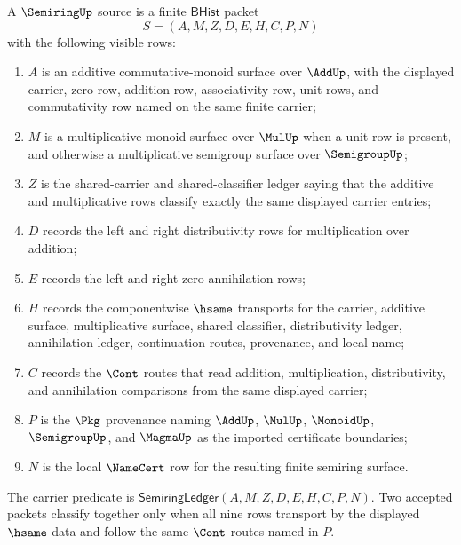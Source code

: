 \begin{definition}
\label{def:semiring-bhist-source}
A $\SemiringUp$ source is a finite $\mathsf{BHist}$ packet
$$
S=(A,M,Z,D,E,H,C,P,N)
$$
with the following visible rows:
\begin{enumerate}
\item $A$ is an additive commutative-monoid surface over $\AddUp$, with the
displayed carrier, zero row, addition row, associativity row, unit rows, and
commutativity row named on the same finite carrier;
\item $M$ is a multiplicative monoid surface over $\MulUp$ when a unit row is
present, and otherwise a multiplicative semigroup surface over
$\SemigroupUp$;
\item $Z$ is the shared-carrier and shared-classifier ledger saying that the
additive and multiplicative rows classify exactly the same displayed carrier
entries;
\item $D$ records the left and right distributivity rows for multiplication
over addition;
\item $E$ records the left and right zero-annihilation rows;
\item $H$ records the componentwise $\hsame$ transports for the carrier,
additive surface, multiplicative surface, shared classifier, distributivity
ledger, annihilation ledger, continuation routes, provenance, and local name;
\item $C$ records the $\Cont$ routes that read addition, multiplication,
distributivity, and annihilation comparisons from the same displayed carrier;
\item $P$ is the $\Pkg$ provenance naming $\AddUp$, $\MulUp$, $\MonoidUp$,
$\SemigroupUp$, and $\MagmaUp$ as the imported certificate boundaries;
\item $N$ is the local $\NameCert$ row for the resulting finite semiring
surface.
\end{enumerate}
The carrier predicate is
$\mathsf{SemiringLedger}(A,M,Z,D,E,H,C,P,N)$. Two accepted packets classify
together only when all nine rows transport by the displayed $\hsame$ data and
follow the same $\Cont$ routes named in $P$.
\end{definition}

